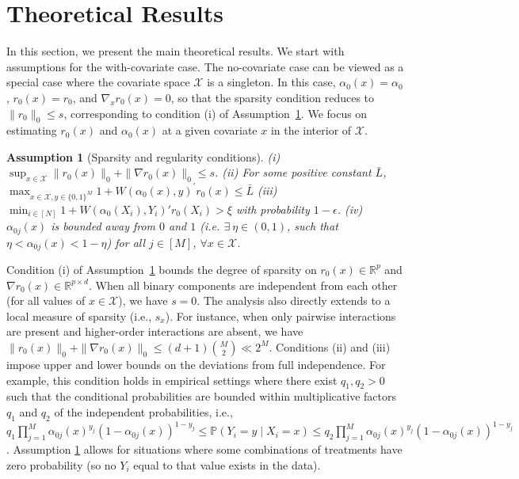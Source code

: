 \documentclass[11pt]{article}
\newtheorem{assumption}{Assumption}
\begin{document}
\section{Theoretical Results}\label{sec:theoretical}
In this section, we present the main theoretical results. We start with assumptions for the with-covariate case. The no-covariate case can be viewed as a special case where the covariate space $\mathcal{X}$ is a singleton. In this case, $\alpha_0(x)=\alpha_0$, $r_0(x)=r_0$, and $\nabla_x r_0(x)=0$, so that the sparsity condition reduces to $\|r_0\|_0\le s$, corresponding to condition (i) of Assumption~\ref{ass:iid-min-den}. We focus on estimating $r_0(x)$ and $\alpha_0(x)$ at a given covariate $x$ in the interior of $\mathcal{X}$. 

\begin{assumption}[Sparsity and regularity conditions]\label{ass:iid-min-den}
(i) $\sup_{x \in \mathcal{X}} \|r_0(x)\|_0+\|\nabla r_0(x)\|_0 \leq s$. (ii) For some positive constant $\bar{L}$, ${ \displaystyle \max_{x\in\mathcal{X}, y\in \{0,1\}^M}} 1+W(\alpha_0(x),y)^\prime r_0(x) \leq \bar L$ (iii) ${ \displaystyle \min_{i\in [N]}} 1+W(\alpha_0(X_i),Y_i)'r_0(X_i) > \xi$ with probability $1-\epsilon$. (iv) $\alpha_{0j}(x)$ is bounded away from $0$ and $1$ (i.e. $\exists\ \eta\in(0,1)$, such that $\eta<\alpha_{0j}(x)<1-\eta$) for all $j\in[M]$, $\forall x\in\mathcal{X}$. 
\end{assumption}
Condition (i) of Assumption~\ref{ass:iid-min-den} bounds the degree of sparsity on $r_0(x) \in \mathbb{R}^p$ and $\nabla r_0(x) \in \mathbb{R}^{p\times d}$. When all binary components are independent from each other (for all values of $x\in\mathcal{X}$), we have $s=0$. The analysis also directly extends to a local measure of sparsity (i.e., $s_x$). For instance, when only pairwise interactions are present and higher-order interactions are absent, we have $\|r_0(x)\|_0+\|\nabla r_0(x)\|_0\leq(d+1)\binom{M}{2}\ll 2^M$.
Conditions (ii) and (iii) impose upper and lower bounds on the deviations from full independence. For example, this condition holds in empirical settings where there exist $q_1, q_2>0$ such that the conditional probabilities are bounded within multiplicative factors $q_1$ and $q_2$ of the independent probabilities, i.e., $q_1\prod_{j=1}^M\alpha_{0j}(x)^{y_j}(1-\alpha_{0j}(x))^{1-y_j}\le \mathbb{P}(Y_i=y\mid X_i=x) \le q_2\prod_{j=1}^M\alpha_{0j}(x)^{y_j}(1-\alpha_{0j}(x))^{1-y_j}$. Assumption \ref{ass:iid-min-den} allows for situations where some combinations of treatments have zero probability (so no $Y_i$ equal to that value exists in the data). 
\end{document}
